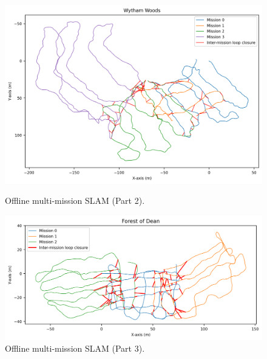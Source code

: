 \begin{figure}[htbp]
  \ContinuedFloat
  \centering
  \includegraphics[width=\columnwidth]{pics/exp_3_1_multimission_slam_wytham.png}
  \caption{Offline multi-mission SLAM (Part 2).}
  \includegraphics[width=\columnwidth]{pics/exp_3_1_multimission_slam_dean.png}
  \caption{Offline multi-mission SLAM (Part 3).}
  \label{fig:exp_multi_mission_part3}
\end{figure}


